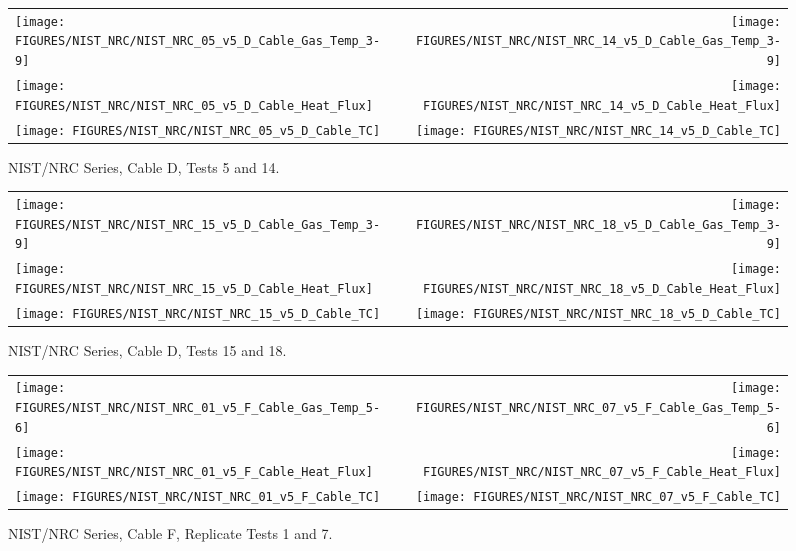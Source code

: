 \begin{figure}[h]
\begin{tabular*}{\textwidth}{l@{\extracolsep{\fill}}r}
\texttt{[image: FIGURES/NIST\_NRC/NIST\_NRC\_05\_v5\_D\_Cable\_Gas\_Temp\_3-9]} &
\texttt{[image: FIGURES/NIST\_NRC/NIST\_NRC\_14\_v5\_D\_Cable\_Gas\_Temp\_3-9]} \\
\texttt{[image: FIGURES/NIST\_NRC/NIST\_NRC\_05\_v5\_D\_Cable\_Heat\_Flux]} &
\texttt{[image: FIGURES/NIST\_NRC/NIST\_NRC\_14\_v5\_D\_Cable\_Heat\_Flux]} \\
\texttt{[image: FIGURES/NIST\_NRC/NIST\_NRC\_05\_v5\_D\_Cable\_TC]} &
\texttt{[image: FIGURES/NIST\_NRC/NIST\_NRC\_14\_v5\_D\_Cable\_TC]}
\end{tabular*}
\caption{NIST/NRC Series, Cable D, Tests 5 and 14.}
\label{NIST_NRC_D_5_and_14}
\end{figure}

\begin{figure}[h]
\begin{tabular*}{\textwidth}{l@{\extracolsep{\fill}}r}
\texttt{[image: FIGURES/NIST\_NRC/NIST\_NRC\_15\_v5\_D\_Cable\_Gas\_Temp\_3-9]} &
\texttt{[image: FIGURES/NIST\_NRC/NIST\_NRC\_18\_v5\_D\_Cable\_Gas\_Temp\_3-9]} \\
\texttt{[image: FIGURES/NIST\_NRC/NIST\_NRC\_15\_v5\_D\_Cable\_Heat\_Flux]} &
\texttt{[image: FIGURES/NIST\_NRC/NIST\_NRC\_18\_v5\_D\_Cable\_Heat\_Flux]} \\
\texttt{[image: FIGURES/NIST\_NRC/NIST\_NRC\_15\_v5\_D\_Cable\_TC]} &
\texttt{[image: FIGURES/NIST\_NRC/NIST\_NRC\_18\_v5\_D\_Cable\_TC]}
\end{tabular*}
\caption{NIST/NRC Series, Cable D, Tests 15 and 18.}
\label{NIST_NRC_D_15_and_18}
\end{figure}


\clearpage



\vspace{1in}

\begin{figure}[h!]
\begin{tabular*}{\textwidth}{l@{\extracolsep{\fill}}r}
\texttt{[image: FIGURES/NIST\_NRC/NIST\_NRC\_01\_v5\_F\_Cable\_Gas\_Temp\_5-6]} &
\texttt{[image: FIGURES/NIST\_NRC/NIST\_NRC\_07\_v5\_F\_Cable\_Gas\_Temp\_5-6]} \\
\texttt{[image: FIGURES/NIST\_NRC/NIST\_NRC\_01\_v5\_F\_Cable\_Heat\_Flux]} &
\texttt{[image: FIGURES/NIST\_NRC/NIST\_NRC\_07\_v5\_F\_Cable\_Heat\_Flux]} \\
\texttt{[image: FIGURES/NIST\_NRC/NIST\_NRC\_01\_v5\_F\_Cable\_TC]} &
\texttt{[image: FIGURES/NIST\_NRC/NIST\_NRC\_07\_v5\_F\_Cable\_TC]}
\end{tabular*}
\caption{NIST/NRC Series, Cable F, Replicate Tests 1 and 7.}
\label{NIST_NRC_F_1_and_7}
\end{figure}

